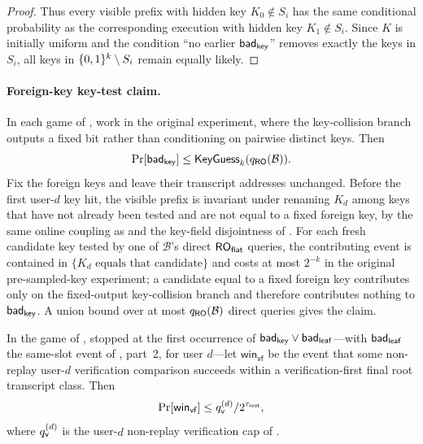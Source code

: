 \begin{proof}
Thus every visible prefix with hidden key $K_0 \notin S_i$ has the
same conditional probability as the corresponding execution with hidden
key $K_1 \notin S_i$. Since $K$ is initially uniform and the condition
``no earlier $\mathsf{bad}_{\mathsf{key}}$'' removes exactly the keys in
$S_i$, all keys in $\{0,1\}^k \setminus S_i$ remain equally likely.
\end{proof}

\paragraph{Foreign-key key-test claim.}
In each game of , work in the original
experiment, where the key-collision branch outputs a fixed bit rather
than conditioning on pairwise distinct keys. Then
\[
  \Pr[\mathsf{bad}_{\mathsf{key}}] \leq \mathsf{KeyGuess}_k(q_{\mathsf{RO}}(\mathcal{B})).
\]
Fix the foreign keys and leave their transcript addresses unchanged.
Before the first user-$d$ key hit, the visible prefix is invariant under
renaming $K_d$ among keys that have not already been tested and are not
equal to a fixed foreign key, by the same online coupling as
 and the key-field disjointness of
. For each fresh candidate key tested by one of
$\mathcal{B}$'s direct $\mathsf{RO}_{\mathsf{flat}}$ queries, the contributing event is
contained in $\{K_d \text{ equals that candidate}\}$ and costs at most
$2^{-k}$ in the original pre-sampled-key experiment; a candidate equal
to a fixed foreign key contributes only on the fixed-output
key-collision branch and therefore contributes nothing to
$\mathsf{bad}_{\mathsf{key}}$. A union bound over at most $q_{\mathsf{RO}}(\mathcal{B})$ direct
queries gives the claim.

\begin{lemma}
\label{lem:ver-first-root-guess}
In the game \Grej{} of , stopped at the
first occurrence of $\mathsf{bad}_{\mathsf{key}} \vee \mathsf{bad}_{\mathsf{leaf}}$---with $\mathsf{bad}_{\mathsf{leaf}}$ the
same-slot event of , part~2, for user
$d$---let $\mathsf{win}_{\mathsf{vf}}$ be the event that some
non-replay user-$d$ verification comparison succeeds within a
verification-first final root transcript class. Then
\[
  \Pr[\mathsf{win}_{\mathsf{vf}}]
  \leq q_{\mathsf{v}}^{(d)} / 2^{\tau_{\mathsf{root}}},
\]
where $q_{\mathsf{v}}^{(d)}$ is the user-$d$ non-replay verification cap of
.
\end{lemma}

